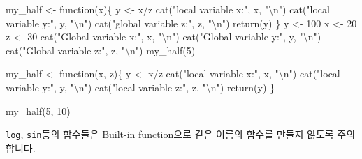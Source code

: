 \documentclass[
  a4paper,
]{book}
\newenvironment{Shaded}{\begin{snugshade}}{\end{snugshade}}
\newcommand{\ControlFlowTok}[1]{\textcolor[rgb]{0.00,0.23,0.31}{#1}}
\newcommand{\DecValTok}[1]{\textcolor[rgb]{0.68,0.00,0.00}{#1}}
\newcommand{\FunctionTok}[1]{\textcolor[rgb]{0.28,0.35,0.67}{#1}}
\newcommand{\NormalTok}[1]{\textcolor[rgb]{0.00,0.23,0.31}{#1}}
\newcommand{\OtherTok}[1]{\textcolor[rgb]{0.00,0.23,0.31}{#1}}
\newcommand{\SpecialCharTok}[1]{\textcolor[rgb]{0.37,0.37,0.37}{#1}}
\newcommand{\StringTok}[1]{\textcolor[rgb]{0.13,0.47,0.30}{#1}}
\begin{document}
\begin{Shaded}
\begin{Highlighting}[]
\NormalTok{my\_half }\OtherTok{\textless{}{-}} \ControlFlowTok{function}\NormalTok{(x)\{}
\NormalTok{  y }\OtherTok{\textless{}{-}}\NormalTok{ x}\SpecialCharTok{/}\NormalTok{z}
  \FunctionTok{cat}\NormalTok{(}\StringTok{"local variable x:"}\NormalTok{, x, }\StringTok{"}\SpecialCharTok{\textbackslash{}n}\StringTok{"}\NormalTok{)}
  \FunctionTok{cat}\NormalTok{(}\StringTok{"local variable y:"}\NormalTok{, y, }\StringTok{"}\SpecialCharTok{\textbackslash{}n}\StringTok{"}\NormalTok{)}
  \FunctionTok{cat}\NormalTok{(}\StringTok{"global variable z:"}\NormalTok{, z, }\StringTok{"}\SpecialCharTok{\textbackslash{}n}\StringTok{"}\NormalTok{)}
  \FunctionTok{return}\NormalTok{(y)}
\NormalTok{\}}
\NormalTok{y }\OtherTok{\textless{}{-}} \DecValTok{100}
\NormalTok{x }\OtherTok{\textless{}{-}} \DecValTok{20}
\NormalTok{z }\OtherTok{\textless{}{-}} \DecValTok{30}
\FunctionTok{cat}\NormalTok{(}\StringTok{"Global variable x:"}\NormalTok{, x, }\StringTok{"}\SpecialCharTok{\textbackslash{}n}\StringTok{"}\NormalTok{)}
\FunctionTok{cat}\NormalTok{(}\StringTok{"Global variable y:"}\NormalTok{, y, }\StringTok{"}\SpecialCharTok{\textbackslash{}n}\StringTok{"}\NormalTok{)}
\FunctionTok{cat}\NormalTok{(}\StringTok{"Global variable z:"}\NormalTok{, z, }\StringTok{"}\SpecialCharTok{\textbackslash{}n}\StringTok{"}\NormalTok{)}
\FunctionTok{my\_half}\NormalTok{(}\DecValTok{5}\NormalTok{)}

\NormalTok{my\_half }\OtherTok{\textless{}{-}} \ControlFlowTok{function}\NormalTok{(x, z)\{}
\NormalTok{  y }\OtherTok{\textless{}{-}}\NormalTok{ x}\SpecialCharTok{/}\NormalTok{z}
  \FunctionTok{cat}\NormalTok{(}\StringTok{"local variable x:"}\NormalTok{, x, }\StringTok{"}\SpecialCharTok{\textbackslash{}n}\StringTok{"}\NormalTok{)}
  \FunctionTok{cat}\NormalTok{(}\StringTok{"local variable y:"}\NormalTok{, y, }\StringTok{"}\SpecialCharTok{\textbackslash{}n}\StringTok{"}\NormalTok{)}
  \FunctionTok{cat}\NormalTok{(}\StringTok{"local variable z:"}\NormalTok{, z, }\StringTok{"}\SpecialCharTok{\textbackslash{}n}\StringTok{"}\NormalTok{)}
  \FunctionTok{return}\NormalTok{(y)}
\NormalTok{\}}

\FunctionTok{my\_half}\NormalTok{(}\DecValTok{5}\NormalTok{, }\DecValTok{10}\NormalTok{)}
\end{Highlighting}
\end{Shaded}

\texttt{log}, \texttt{sin}등의 함수들은 Built-in function으로 같은
이름의 함수를 만들지 않도록 주의합니다.
\end{document}
